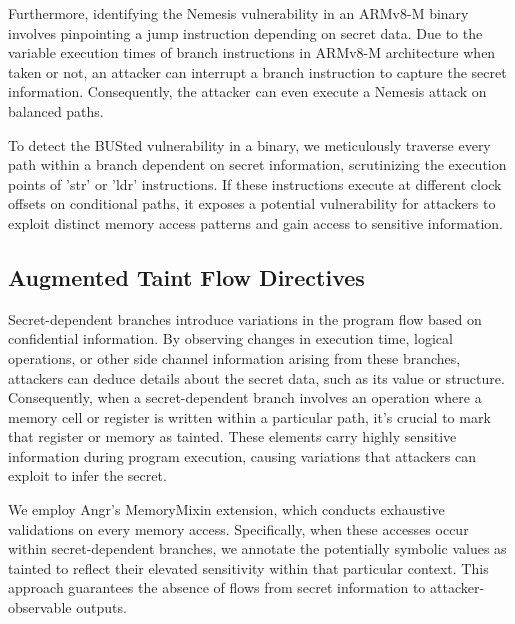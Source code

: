 Furthermore, identifying the Nemesis vulnerability in an ARMv8-M binary involves pinpointing a jump instruction depending on secret data. Due to the variable execution times of branch instructions in ARMv8-M architecture when taken or not, an attacker can interrupt a branch instruction to capture the secret information. Consequently, the attacker can even execute a Nemesis attack on balanced paths.

To detect the BUSted vulnerability in a binary, we meticulously traverse every path within a branch dependent on secret information, scrutinizing the execution points of 'str' or 'ldr' instructions. If these instructions execute at different clock offsets on conditional paths, it exposes a potential vulnerability for attackers to exploit distinct memory access patterns and gain access to sensitive information.

\subsection{Augmented Taint Flow Directives}

Secret-dependent branches introduce variations in the program flow based on confidential information. By observing changes in execution time, logical operations, or other side channel information arising from these branches, attackers can deduce details about the secret data, such as its value or structure. Consequently, when a secret-dependent branch involves an operation where a memory cell or register is written within a particular path, it's crucial to mark that register or memory as tainted. These elements carry highly sensitive information during program execution, causing variations that attackers can exploit to infer the secret.

We employ Angr’s MemoryMixin extension, which conducts exhaustive validations on every memory access. Specifically, when these accesses occur within secret-dependent branches, we annotate the potentially symbolic values as tainted to reflect their elevated sensitivity within that particular context. This approach guarantees the absence of flows from secret information to attacker-observable outputs.
